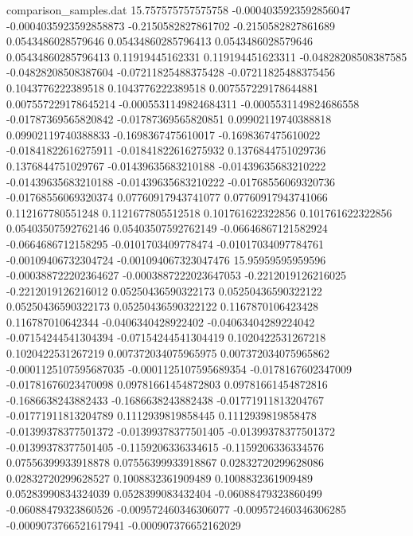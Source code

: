\begin{filecontents}{comparison_samples.dat}
15.757575757575758  -0.0004035923592856047  -0.0004035923592858873  -0.2150582827861702    -0.2150582827861689    0.0543486028579646     0.05434860285796413    0.0543486028579646     0.05434860285796413    0.11919445162331       0.119194451623311      -0.04828208508387585    -0.04828208508387604    -0.07211825488375428   -0.07211825488375456   0.1043776222389518      0.1043776222389518      0.007557229178644881    0.007557229178645214    -0.0005531149824684311  -0.0005531149824686558  -0.01787369565820842    -0.01787369565820851    0.09902119740388818     0.09902119740388833     -0.1698367475610017     -0.1698367475610022     -0.01841822616275911   -0.01841822616275932   0.1376844751029736     0.1376844751029767     -0.01439635683210188    -0.01439635683210222    -0.01439635683210188    -0.01439635683210222    -0.01768556069320736   -0.01768556069320374   0.07760917943741077     0.07760917943741066     0.112167780551248      0.1121677805512518     0.101761622322856       0.101761622322856       0.05403507592762146     0.05403507592762149     -0.06646867121582924   -0.0664686712158295    -0.0101703409778474    -0.01017034097784761   -0.00109406732304724    -0.001094067323047476 
15.95959595959596   -0.000388722202364627   -0.0003887222023647053  -0.2212019126216025    -0.2212019126216012    0.05250436590322173    0.05250436590322122    0.05250436590322173    0.05250436590322122    0.1167870106423428     0.116787010642344      -0.0406340428922402     -0.04063404289224042    -0.07154244541304394   -0.07154244541304419   0.1020422531267218      0.1020422531267219      0.007372034075965975    0.007372034075965862    -0.0001125107595687035  -0.0001125107595689354  -0.0178167602347009     -0.01781676023470098    0.09781661454872803     0.09781661454872816     -0.1686638243882433     -0.1686638243882438     -0.01771911813204767   -0.01771911813204789   0.1112939819858445     0.1112939819858478     -0.01399378377501372    -0.01399378377501405    -0.01399378377501372    -0.01399378377501405    -0.1159206336334615    -0.1159206336334576    0.07556399933918878     0.07556399933918867     0.02832720299628086    0.02832720299628527    0.1008832361909489      0.1008832361909489      0.05283990834324039     0.0528399083432404      -0.06088479323860499   -0.06088479323860526   -0.009572460346306077  -0.009572460346306285  -0.0009073766521617941  -0.000907376652162029 

\end{filecontents}
